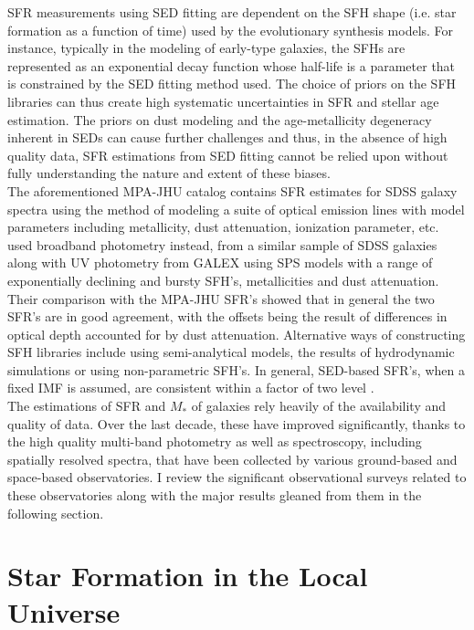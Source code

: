 SFR measurements using SED fitting are dependent on the SFH shape
(i.e. star formation as a function of time) used by the evolutionary
synthesis models. For instance, typically in the modeling of
early-type galaxies, the SFHs are represented as an exponential decay
function whose half-life is a parameter that is constrained by the SED
fitting method used. The choice of priors on the SFH libraries can
thus create high systematic uncertainties in SFR and stellar age
estimation. The priors on dust modeling and the age-metallicity
degeneracy inherent in SEDs can cause further challenges and thus, in
the absence of high quality data, SFR estimations from SED fitting
cannot be relied upon without fully understanding the nature and
extent of these biases.\\

The aforementioned MPA-JHU catalog contains SFR estimates for SDSS
galaxy spectra using the \citet{brinchmann_physical_2004} method of
modeling a suite of optical emission lines with model parameters
including metallicity, dust attenuation, ionization parameter,
etc. \citet{salim_uv_2007} used broadband photometry instead, from a
similar sample of SDSS galaxies along with UV photometry from GALEX
using SPS models with a range of exponentially declining and bursty
SFH's, metallicities and dust attenuation. Their comparison with the
MPA-JHU SFR's showed that in general the two SFR's are in good
agreement, with the offsets being the result of differences in optical
depth accounted for by dust attenuation. Alternative ways of
constructing SFH libraries include using semi-analytical models, the
results of hydrodynamic simulations or using non-parametric SFH's. In
general, SED-based SFR's, when a fixed IMF is assumed, are consistent
within a factor of two level \citep{conroy_modeling_2013}.\\

The estimations of SFR and $M_{*}$ of galaxies rely heavily of the
availability and quality of data. Over the last decade, these have
improved significantly, thanks to the high quality multi-band
photometry as well as spectroscopy, including spatially resolved
spectra, that have been collected by various ground-based and
space-based observatories. I review the significant observational
surveys related to these observatories along with the major results
gleaned from them in the following section.\\

\section{Star Formation in the Local Universe}

